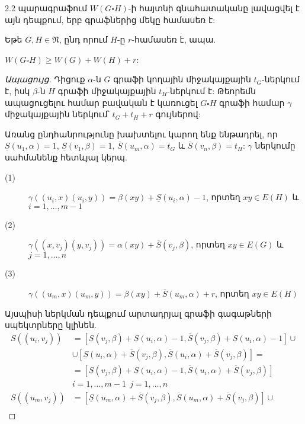 2.2 պարագրաֆում $W(G\square H)$-ի հայտնի գնահատականը լավացվել է այն դեպքում, երբ գրաֆներից մեկը համասեռ է: 

\begin{theorem}
\label{t2_regular_product} Եթե $G,H\in \mathfrak{N}$, ընդ որում $H$-ը $r$-համասեռ է, ապա.
\begin{center}
$W(G\square H)\geq W(G)+W(H)+r$:
\end{center}
\end{theorem}
\begin{proof}[Ապացույց]
Դիցուք $\alpha$-ն $G$ գրաֆի կողային միջակայքային $t_G$-ներկում է, իսկ $\beta$-ն $H$ գրաֆի միջակայքային $t_H$-ներկում է: Թեորեմն ապացուցելու համար բավական է կառուցել $G\square H$ գրաֆի համար $\gamma$ միջակայքային ներկում՝ $t_G+t_H+r$ գույներով: 

Առանց ընդհանրությունը խախտելու կարող ենք ենթադրել, որ $\underline{S}(u_1,\alpha)=1$, $\underline{S}(v_1,\beta)=1$, $\overline{S}(u_m,\alpha)=t_G$ և $\overline{S}(v_n,\beta)=t_H$: $\gamma$ ներկումը սահմանենք հետևյալ կերպ.
\begin{description}
\item[(1)] $\gamma\left((u_i,x)(u_i,y)\right) = \beta(xy) + \underline{S}(u_i,\alpha) - 1$, որտեղ $xy \in E(H)$ և $i=1,\ldots,m-1$
\item[(2)] $\gamma\left((x,v_j)(y,v_j)\right) = \alpha(xy) + \overline{S}(v_j,\beta)$, որտեղ $xy \in E(G)$ և $j=1,\ldots,n$
\item[(3)] $\gamma\left((u_m,x)(u_m,y)\right) = \beta(xy) + \overline{S}(u_m,\alpha) + r$, որտեղ $xy \in E(H)$
\end{description}
Այսպիսի ներկման դեպքում արտադրյալ գրաֆի գագաթների սպեկտրները կլինեն.
\begin{align*}
S\left( (u_i,v_j) \right) &= \left[ \underline{S}(v_j,\beta) + \underline{S}(u_i,\alpha) - 1, \overline{S}(v_j,\beta) + \underline{S}(u_i,\alpha) - 1 \right] \cup \\
&\cup \left[ \underline{S}(u_i,\alpha) + \overline{S}(v_j,\beta), \overline{S}(u_i,\alpha) + \overline{S}(v_j,\beta) \right] = \\
&= \left[ \underline{S}(v_j,\beta) + \underline{S}(u_i,\alpha) - 1, \overline{S}(u_i,\alpha) + \overline{S}(v_j,\beta) \right]\\
&i=1,\ldots,m-1\ \ j=1,\ldots,n\\
S\left( (u_m,v_j) \right) &= \left[ \underline{S}(u_m,\alpha) + \overline{S}(v_j,\beta), \overline{S}(u_m,\alpha) + \overline{S}(v_j,\beta) \right] \cup \\

\end{align*}
\end{proof}

